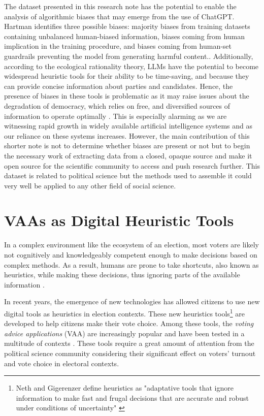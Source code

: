 \documentclass{article}
\begin{document}
The dataset presented in this research note has the potential to enable the analysis of algorithmic biases that may emerge from the use of ChatGPT. Hartman identifies three possible biases: majority biases from training datasets containing unbalanced human-biased information, biases coming from human implication in the training procedure, and biases coming from human-set guardrails preventing the model from generating harmful content.\parencite{hartmann_etal23}. Additionally, according to the ecological rationality theory, LLMs have the potential to become widespread heuristic tools for their ability to be time-saving, and because they can provide concise information about parties and candidates. Hence, the presence of biases in these tools is problematic as it may raise issues about the degradation of democracy, which relies on free, and diversified sources of information to operate optimally \parencite{dahl06}. This is especially alarming as we are witnessing rapid growth in widely available artificial intelligence systems and as our reliance on these systems increases. \parencite{rozado23} However, the main contribution of this shorter note is not to determine whether biases are present or not but to begin the necessary work of extracting data from a closed, opaque source and make it open source for the scientific community to access and push research further. This dataset is related to political science but the methods used to assemble it could very well be applied to any other field of social science.\par

\section{VAAs as Digital Heuristic Tools}

In a complex environment like the ecosystem of an election, most voters are likely not cognitively and knowledgeably competent enough to make decisions based on complex methods. As a result, humans are prone to take shortcuts, also known as heuristics, while making these decisions, thus ignoring parts of the available information \parencite{gigerenzer_gaissmaier11}. \par

In recent years, the emergence of new technologies has allowed citizens to use new digital tools as heuristics in election contexts. These new heuristics tools\footnote{ Neth and Gigerenzer define heuristics as "adaptative tools that ignore information to make fast and frugal decisions that are accurate and robust under conditions of uncertainty" \parencite{neth_gigerenzer15}} are developed to help citizens make their vote choice. Among these tools, the \textit{voting advice applications} (VAA) are increasingly popular and have been tested in a multitude of contexts \parencite{garzia_marschall12, garzia_marschall19}. These tools require a great amount of attention from the political science community considering their significant effect on voters' turnout and vote choice in electoral contexts.
\end{document}
